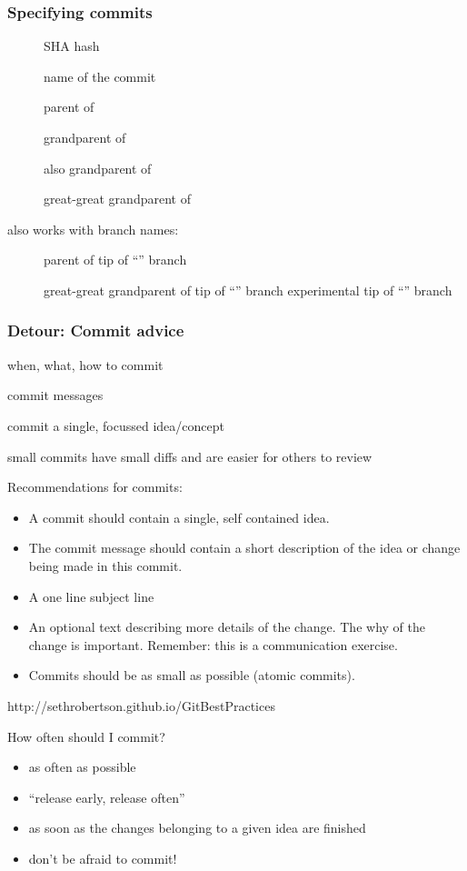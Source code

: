 \begin{frame}
\frametitle{Specifying commits}
\begin{description}
    \item[] SHA hash
    \item[] name of the commit
    \item[] parent of 
    \item[] grandparent of 
    \item[] also grandparent of 
    \item[] great-great grandparent of 
\end{description}

also works with branch names:
\begin{description}
    \item[] parent of tip of “” branch
    \item[] great-great grandparent of tip of “” branch
        experimental tip of “” branch
\end{description}
\end{frame}

\begin{frame}
\frametitle{Detour: Commit advice}

when, what, how to commit

commit messages

commit a single, focussed idea/concept

small commits have small diffs and are easier for others to review

Recommendations for commits:

\begin{itemize}
    \item A commit should contain a single, self contained idea.
    \item The commit message should contain a short description
        of the idea or change being made in this commit.
    \item A one line subject line
    \item An optional text describing more details of the change. The
        why of the change is important. Remember: this is a
        communication exercise.
    \item Commits should be as small as possible (atomic commits).
\end{itemize}

    http://sethrobertson.github.io/GitBestPractices

How often should I commit?
\begin{itemize}
    \item as often as possible
    \item “release early, release often”
    \item as soon as the changes belonging to a given idea are
        ﬁnished
    \item don’t be afraid to commit!
\end{itemize}

\end{frame}

